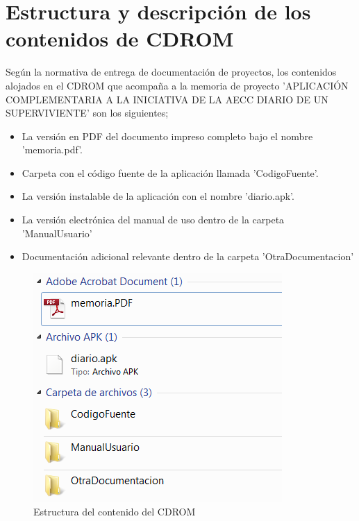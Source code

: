 \documentclass[../pfc.tex]{subfiles}
\begin{document}
	
	\section{Estructura y descripción de los contenidos de CDROM}
	
	Según la normativa de entrega de documentación de proyectos, los contenidos alojados en el CDROM que acompaña a la memoria de proyecto 'APLICACIÓN COMPLEMENTARIA A LA INICIATIVA DE LA AECC DIARIO DE UN SUPERVIVIENTE' son los siguientes;
	
	\begin{itemize}
		\item La versión en PDF del documento impreso completo bajo el nombre 'memoria.pdf'.
		\item Carpeta con el código fuente de la aplicación llamada 'CodigoFuente'.
		\item La versión instalable de la aplicación con el nombre 'diario.apk'.
		\item La versión electrónica del manual de uso dentro de la carpeta 'ManualUsuario'
		\item Documentación adicional relevante dentro de la carpeta 'OtraDocumentacion'
	\end{itemize}
	
	\begin{figure}[H]
		\centering
		\includegraphics[width=0.6\linewidth]{../images/contenidoCD}
		\caption{Estructura del contenido del CDROM}
		\label{fig:cleanarch}
	\end{figure}
	
\end{document}
